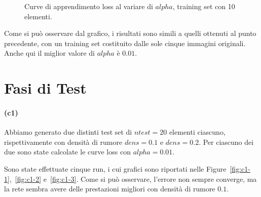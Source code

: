 \documentclass[a4paper,12pt]{article}
\begin{document}
\begin{figure}[htb]
    \centering
    \caption{Curve di apprendimento loss al variare di $alpha$, training set con 10 elementi.}
    \label{fig:b2}
\end{figure}

Come si può osservare dal grafico, i risultati sono simili a quelli ottenuti al punto precedente, con un training set costituito dalle sole cinque immagini originali. Anche qui il miglior valore di $alpha$ è $0.01$.



\newpage
\section{Fasi di Test}

\paragraph{(c1)} Abbiamo generato due distinti test set di $ntest=20$ elementi ciascuno, rispettivamente con densità di rumore $dens=0.1$ e $dens=0.2$. Per ciascuno dei due sono state calcolate le curve loss con $alpha=0.01$.

Sono state effettuate cinque run, i cui grafici sono riportati nelle Figure~\vref{fig:c1-1},~\vref{fig:c1-2} e~\vref{fig:c1-3}. Come si può osservare, l'errore non sempre converge, ma la rete sembra avere delle prestazioni migliori con densità di rumore $0.1$.
\end{document}
